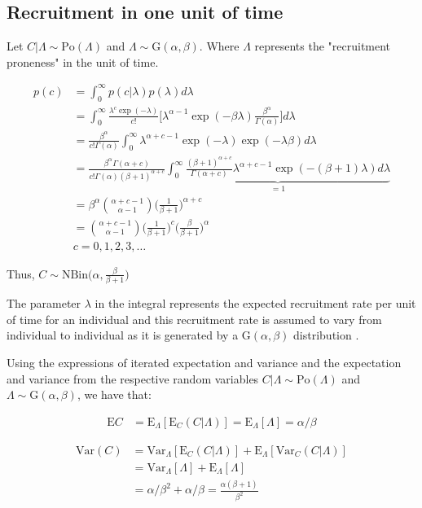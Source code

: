 \subsection{Recruitment in one unit of time}

Let $C|\Lambda \sim \textrm{Po}(\Lambda)$ and $\Lambda \sim \textrm{G}(\alpha,\beta)$. Where $\Lambda$ represents the "recruitment proneness" in the unit of time. 

\begin{align*}
p(c)&=\int^\infty_0 p(c|\lambda) p(\lambda) d\lambda\\
&=\int^\infty_0 \frac{\lambda^c\exp(-\lambda)}{c!}\Bigg[\lambda^{\alpha-1}\exp(-\beta\lambda)\frac{\beta^\alpha}{\Gamma(\alpha)}\Bigg]d\lambda\\
&=\frac{\beta^\alpha}{c!\Gamma(\alpha)}\int^\infty_0 \lambda^{\alpha+c-1}\exp(-\lambda)\exp(-\lambda\beta)d\lambda\\
&=\frac{\beta^\alpha\Gamma(\alpha+c)}{c!\Gamma(\alpha) (\beta+1)^{\alpha+c}}\underbrace{\int^\infty_0 \frac{(\beta+1)^{\alpha+c}}{\Gamma(\alpha+c)} \lambda^{\alpha+c-1}\exp(-(\beta+1)\lambda)d\lambda}_{=1}\\
&=\beta^\alpha\binom{\alpha+c-1}{\alpha-1}\Bigg (\frac{1}{\beta+1}\Bigg)^{\alpha+c}\\
&=\binom{\alpha+c-1}{\alpha-1}\Bigg (\frac{1}{\beta+1}\Bigg)^{c} \Bigg(\frac{\beta}{\beta+1}\Bigg)^{\alpha}\\
& c = 0,1,2,3,\ldots
\end{align*}

Thus, $C\sim \textrm{NBin} \Bigg(\alpha, \frac{\beta}{\beta+1}\Bigg)$


The parameter $\lambda$ in the integral represents the expected recruitment rate per unit of time for an individual and this recruitment rate is assumed to vary from individual to individual as it is generated by a $\textrm{G}(\alpha,\beta)$ distribution \citep{johnson2005univariate}.


Using the expressions of iterated expectation and variance \citep{held2014applied} and the expectation and variance from the respective random variables $C|\Lambda \sim \textrm{Po}(\Lambda)$ and $\Lambda \sim \textrm{G}(\alpha,\beta)$, we have that:


\begin{align*}
\textrm{E}C &= \textrm{E}_{\Lambda}[\textrm{E}_{C} (C|\Lambda)] = \textrm{E}_{\Lambda}[\Lambda] = \alpha/\beta
\end{align*}

\begin{align*}
\textrm{Var}(C) &= \textrm{Var}_{\Lambda}[\textrm{E}_{C} (C|\Lambda)] + \textrm{E}_{\Lambda}[\textrm{Var}_C(C|\Lambda)]\\
&=\textrm{Var}_{\Lambda}[\Lambda] + \textrm{E}_{\Lambda}[\Lambda] \\
&=\alpha/\beta^2 + \alpha/\beta = \frac{\alpha(\beta+1)}{\beta^2}
\end{align*}


